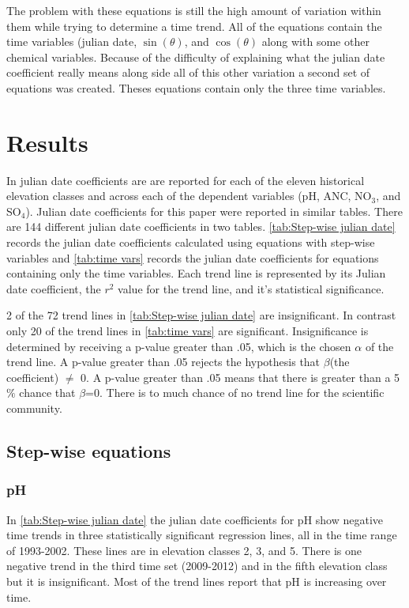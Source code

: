  The problem with these equations is still the high amount of variation within them while trying to determine a time trend.  All of the equations contain the time variables (julian date, $\sin(\theta)$, and $\cos(\theta)$ along with some other chemical variables.  Because of the difficulty of explaining what the julian date coefficient really means along side all of this other variation a second set of equations was created.  Theses equations contain only the three time variables.
 
\section{Results}

In \citet{robinson2008ph} julian date coefficients are are reported for each of the eleven historical elevation classes and across each of the dependent variables (pH, ANC, NO$_3$, and SO$_4$).  Julian date coefficients for this paper were reported in similar tables.  There are 144 different julian date coefficients in two tables.  \autoref{tab:Step-wise julian date} records the julian date coefficients calculated using equations with step-wise variables and \autoref{tab:time vars} records the julian date coefficients for  equations containing only the time variables.  Each trend line is represented by its Julian date coefficient, the $r^2$ value for the trend line, and it's statistical significance.

2 of the 72 trend lines in \autoref{tab:Step-wise julian date} are insignificant.  In contrast only 20 of the trend lines in \autoref{tab:time vars} are significant.   Insignificance is determined  by receiving a p-value greater than .05, which is the chosen $\alpha$ of the trend line.  A p-value greater than .05 rejects the hypothesis that $\beta$(the coefficient) $\neq$ 0.  A p-value greater than .05 means that there is greater than a 5$\%$ chance that $\beta$=0.  There is to much chance of no trend line for the scientific community.

\subsection{Step-wise equations}

\subsubsection{pH}%

In \autoref{tab:Step-wise julian date} the julian date coefficients for pH show negative time trends in three statistically significant regression lines, all in the time range of 1993-2002.  These lines are in elevation classes 2, 3, and 5.  There is one negative trend in the third time set (2009-2012) and in the fifth elevation class but it is insignificant.   Most of the trend lines report that pH is increasing over time.

